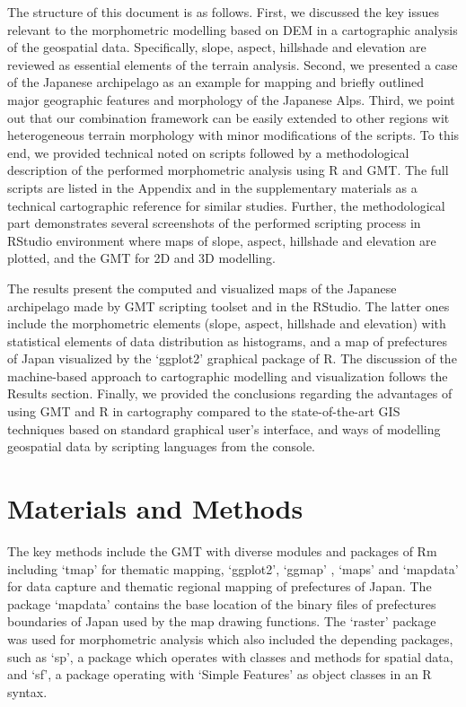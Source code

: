 \documentclass[land,article,submit,pdftex,moreauthors]{Definitions/mdpi}
\begin{document}
The structure of this document is as follows. First, we discussed the key issues relevant to the morphometric modelling based on DEM in a cartographic analysis of the geospatial data. Specifically, slope, aspect, hillshade and elevation are reviewed as essential elements of the terrain analysis. Second, we presented a case of the Japanese archipelago as an example for mapping and briefly outlined major geographic features and morphology of the Japanese Alps. Third, we point out that our combination framework can be easily extended to other regions wit heterogeneous terrain morphology with minor modifications of the scripts. To this end, we provided technical noted on scripts followed by a methodological description of the performed morphometric analysis using R and GMT. The full scripts are listed in the Appendix and in the supplementary materials as a technical cartographic reference for similar studies. Further, the methodological part demonstrates several screenshots of the performed scripting process in RStudio environment where maps of slope, aspect, hillshade and elevation are plotted, and the GMT for 2D and 3D modelling. 

The results present the computed and visualized maps of the Japanese archipelago made by GMT scripting toolset and in the RStudio. The latter ones include the morphometric elements (slope, aspect, hillshade and elevation) with statistical elements of data distribution as histograms, and a map of prefectures of Japan visualized by the ‘ggplot2’ graphical package of R. The discussion of the machine-based approach to cartographic modelling and visualization follows the Results section. Finally, we provided the conclusions regarding the advantages of using GMT and R in cartography compared to the state-of-the-art GIS techniques based on standard graphical user's interface, and ways of modelling geospatial data by scripting languages from the console. 

\section{Materials and Methods}
The key methods include the GMT with diverse modules and packages of Rm including ‘tmap’ for thematic mapping, ‘ggplot2’, ‘ggmap’ \cite{KahleWickham}, ‘maps’ and ‘mapdata’ for data capture and thematic regional mapping of prefectures of Japan. The package ‘mapdata’ contains the base location of the binary files of prefectures boundaries of Japan used by the map drawing functions. The ‘raster’ package was used for morphometric analysis which also included the depending packages, such as ‘sp’, a package which operates with classes and methods for spatial data, and ‘sf’, a package operating with ‘Simple Features’ as object classes in an R syntax. 
\end{document}
